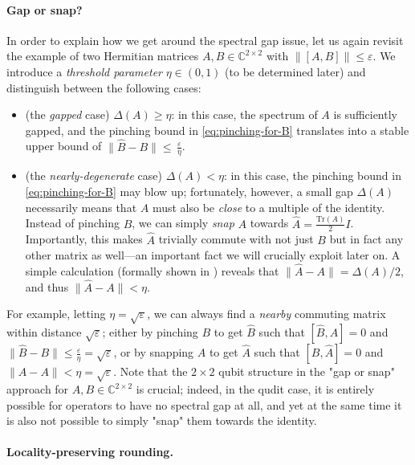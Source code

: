 \documentclass[a4paper,onecolumn,11pt]{quantumarticle}
\theoremstyle{plain}
\newcommand{\eps}{\varepsilon}
\begin{document}
\paragraph{Gap or snap?} In order to explain how we get around the spectral gap issue, let us again revisit the example of two Hermitian matrices $A,B \in \mathbb{C}^{2 \times 2}$ with $\|[A,B]\| \leq \eps$. We introduce a \emph{threshold parameter} $\eta \in (0,1)$ (to be determined later) and distinguish between the following cases:
\begin{itemize}
    \item (the \emph{gapped} case) $\Delta(A) \geq \eta$: in this case, the spectrum of $A$ is sufficiently gapped, and the pinching bound in \eqref{eq:pinching-for-B} translates into a stable upper bound of $\|\hat{B} - B\| \leq  \, \frac{\eps}{\eta}$.

    \item (the \emph{nearly-degenerate} case) $\Delta(A) < \eta$: in this case, the pinching bound in \eqref{eq:pinching-for-B} may blow up; fortunately, however, a small gap $\Delta(A)$ necessarily means that $A$ must also be \emph{close} to a multiple of the identity. Instead of pinching $B$, we can simply \emph{snap} $A$ towards $\hat{A} = \frac{\mathrm{Tr}(A)}{2} I$. Importantly, this makes $\hat{A}$ trivially commute with not just $B$ but in fact any other matrix as well---an important fact we will crucially exploit later on.
    A simple calculation (formally shown in ) reveals that $\|\hat{A} - A\| = \Delta(A)/2$, and thus $\|\hat{A} - A\| < \eta$.
\end{itemize}
For example, letting $\eta = \sqrt{\eps}$, we can always find a \emph{nearby} commuting matrix within distance $\sqrt{\eps}$; either by pinching $B$ to get $\hat B$ such that $[\hat{B},A]=0$ and $\|\hat{B} - B\| \leq \frac{\eps}{\eta} = \sqrt{\eps}$, or by snapping $A$ to get $\hat{A}$ such that $[B,\hat{A}]=0$ and $\|\hat{A} - A\| < \eta = \sqrt{\eps}$.
Note that the $2 \times 2$ qubit structure in the "gap or snap" approach for $A,B \in \mathbb{C}^{2 \times 2}$ is crucial; indeed, in the qudit case, it is entirely possible for operators to have no spectral gap at all, and yet at the same time it is also not possible to simply "snap" them towards the identity.


\paragraph{Locality-preserving rounding.} 
\end{document}
